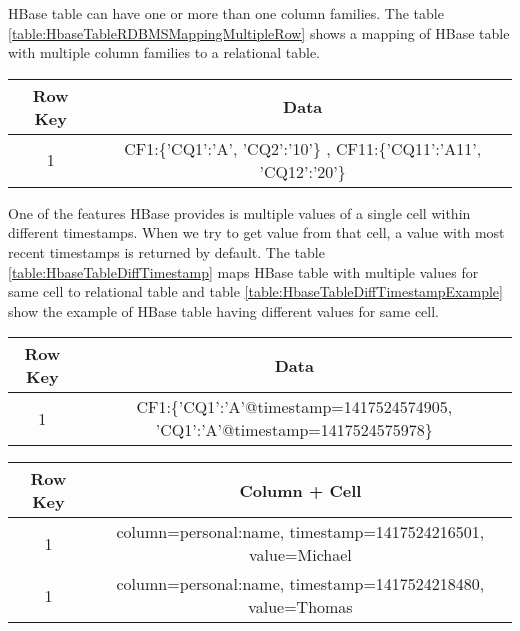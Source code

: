 \documentclass[11pt,a4paper,bibtotoc,idxtotoc,headsepline,footsepline,footexclude,BCOR12mm,DIV13]{scrbook}
\begin{document}
HBase table can have one or more than one column families. The table \ref{table:HbaseTableRDBMSMappingMultipleRow} shows a mapping of HBase table with multiple column families to a relational table.

\begin{table*}[htb!]
	\centering
	\begin{tabular}{|c|c|}
		\hline
		\textbf{Row Key} & \textbf{Data}\\
		\hline
		1 & CF1:\{'CQ1':'A', 'CQ2':'10'\}
		, CF11:\{'CQ11':'A11', 'CQ12':'20'\}\\

		\hline
	\end{tabular}
	\caption{HBase Table with more than one CF}
	\label{table:HbaseTableRDBMSMappingMultipleRow}
\end{table*}

One of the features HBase provides is multiple values of a single cell within different timestamps. When we try to get value from that cell, a value with most recent timestamps is returned by default.  The table \ref{table:HbaseTableDiffTimestamp} maps HBase table with multiple values for same cell to relational table and table \ref{table:HbaseTableDiffTimestampExample} show the example of HBase table having different values for same cell.

\begin{table*}[htb!]
	\centering
	\begin{tabular}{|c|c|}
		\hline
		\textbf{Row Key} & \textbf{Data}\\
		\hline
		1 & CF1:\{'CQ1':'A'@timestamp=1417524574905, 'CQ1':'A'@timestamp=1417524575978\}\\
	
		
		\hline
	\end{tabular}
	\caption{HBase Table with different values at different timestamp}
	\label{table:HbaseTableDiffTimestamp}
\end{table*}

\begin{table*}[htb!]
	\centering
	\begin{tabular}{|c|c|}
		\hline
		\textbf{Row Key} & \textbf{Column + Cell}\\
		\hline
		1 & column=personal:name, timestamp=1417524216501, value=Michael\\
		1 & column=personal:name, timestamp=1417524218480, value=Thomas\\
		
		\hline
	\end{tabular}
	\caption{HBase Table with different values at different timestamp example}
	\label{table:HbaseTableDiffTimestampExample}
\end{table*}
\end{document}
